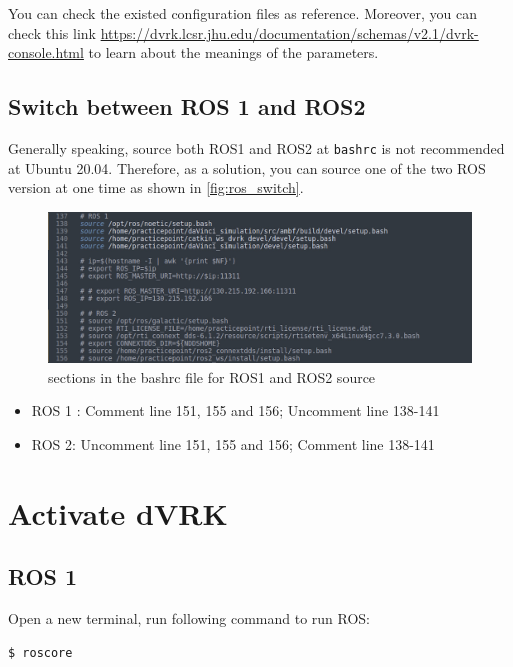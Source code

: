 You can check the existed configuration files as reference. Moreover, you can check this link \url{https://dvrk.lcsr.jhu.edu/documentation/schemas/v2.1/dvrk-console.html} to learn about the meanings of the parameters.

\subsection{Switch between ROS 1 and ROS2}

Generally speaking, source both ROS1 and ROS2 at \texttt{bashrc} is not recommended at Ubuntu 20.04. Therefore, as a solution, you can source one of the two ROS version at one time as shown in \autoref{fig:ros_switch}.

\begin{figure}[H]
    \centering
    \includegraphics[width=0.9\linewidth]{figures/ROS_switch_bash.jpg}
    \caption{sections in the bashrc file for ROS1 and ROS2 source}
    \label{fig:ros_switch}
\end{figure}

\begin{itemize}
    \item ROS 1 : Comment line 151, 155 and 156; Uncomment line 138-141
    \item ROS 2: Uncomment line 151, 155 and 156; Comment line 138-141
\end{itemize}

\section{Activate dVRK}

\subsection{ROS 1}

Open a new terminal, run following command to run ROS:

\begin{verbatim}
$ roscore
\end{verbatim}

